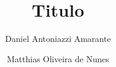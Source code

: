 \documentclass[11pt,twoside,brazil]{pep}
\begin{document}
\title{Titulo}

\author{Daniel Antoniazzi Amarante \and Matthias Oliveira de Nunes}


\maketitle

\maketitlerosto



\begin{agradecimentos}



\end{agradecimentos}

\begin{resumo}

\end{resumo}

\begin{abstract}

\end{abstract}

\listoffigures

\listoftables

\tableofcontents{}

\begin{comment}
Notem que a lista de abreviaturas precisa ser declarada. As abreviaturas do
texto podem estar colocadas em qualquer lugar. A lista final contem a abreviatura,
a explicacao e o numero da pagina onde o simbolo e' usado pela primeira vez
(na verdade, a pagina onde o comando \textbackslash{}abbrev e' declarado\ldots{})
\end{comment}









\end{document}
